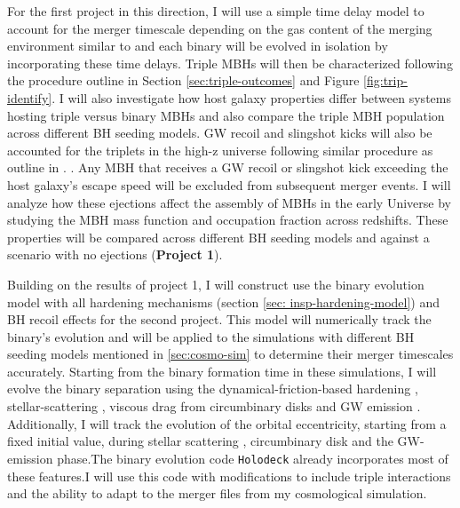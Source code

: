 \documentclass[11pt, letterpaper]{article}
\begin{document}
For the first project in this direction, I will use a simple time delay model to account for the merger timescale depending on the gas content of the merging environment similar to \cite{Blecha2016} and each binary will be evolved in isolation by incorporating these time delays. Triple MBHs will then be characterized following the procedure outline in Section \ref{sec:triple-outcomes} and Figure \ref{fig:trip-identify}. I will also investigate how host galaxy properties differ between systems hosting triple versus binary MBHs and also compare the triple MBH population across different BH seeding models. GW recoil and slingshot kicks will also be accounted for the triplets in the high-z universe following similar procedure as outline in . . Any MBH that receives a GW recoil or slingshot kick exceeding the host galaxy’s escape speed will be excluded from subsequent merger events. I will analyze how these ejections affect the assembly of MBHs in the early Universe by studying the MBH mass function and occupation fraction across redshifts. These properties will be compared across different BH seeding models and against a scenario with no ejections (\textbf{Project 1}). 

Building on the results of project 1, I will construct use the binary evolution model with all hardening mechanisms (section \ref{sec: insp-hardening-model}) and BH recoil effects for the second project. This model will numerically track the binary's evolution and will be applied to the simulations with different BH seeding models mentioned in \ref{sec:cosmo-sim} to determine their merger timescales accurately. Starting from the binary formation time in these simulations, I will evolve the binary separation using the dynamical-friction-based hardening \cite{Chandreshkar1943, Kelley_2018}, stellar-scattering \cite{Sesana_2006}, viscous drag from circumbinary disks \cite{HKM2009,Siwek2023,Siwek2024} and GW emission \cite{Peters_1963}. Additionally, I will track the evolution of the orbital eccentricity, starting from a fixed initial value, during stellar scattering \cite{Sesana_2008,Sesana_2015,Kelley_2018}, circumbinary disk \cite{Siwek2023,Siwek2024} and the GW-emission \cite{Peters_1963} phase.The binary evolution code \texttt{Holodeck} already incorporates most of these features.I will use this code with modifications to include triple interactions and the ability to adapt to the merger files from my cosmological simulation.
\end{document}
